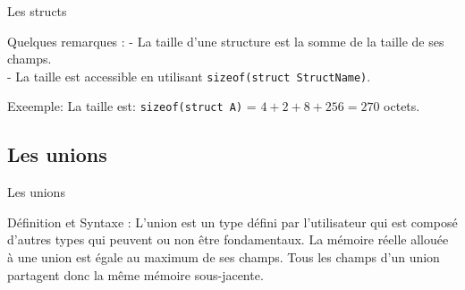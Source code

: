 \documentclass{beamer}
\begin{document}
\begin{darkframes}
  	\begin{frame}{Les structs}
  		\begin{alertblock}{Quelques remarques :}
  			- La taille d'une structure est la somme de la taille de ses champs. \\
  			- La taille est accessible en utilisant \alert{\texttt{sizeof(struct StructName)}}.
  		\end{alertblock}
  		\begin{exampleblock}{Exeemple:}
  			\structExmp
  			La taille est: \texttt{sizeof(struct A)} = $4 + 2 + 8 + 256 = 270$ octets.
  		\end{exampleblock}
  	\end{frame}
  


 
 
  	\subsection{Les unions}
  	\begin{frame}{Les unions}
  		\begin{block}{Définition et Syntaxe :}
  			L'union est un type défini par l'utilisateur qui est composé d'autres types qui peuvent ou non être fondamentaux. La mémoire réelle allouée à une union est égale au maximum de ses champs. Tous les champs d'un union partagent donc la même mémoire sous-jacente.
  			\unionSyntax
  		\end{block}

  	\end{frame}
  	

\end{darkframes}
\end{document}
